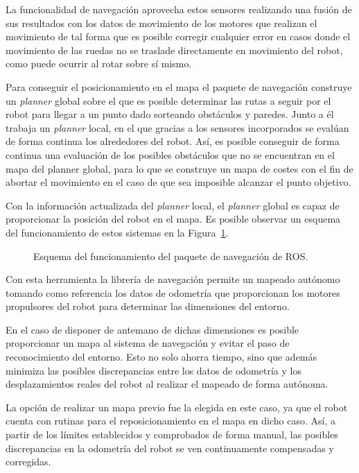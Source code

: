 La funcionalidad de navegación aprovecha estos sensores realizando una fusión de sus resultados con los datos de movimiento de los motores que realizan el movimiento de tal forma que es posible corregir cualquier error en casos donde el movimiento de las ruedas no se traslade directamente en movimiento del robot, como puede ocurrir al rotar sobre sí mismo.

Para conseguir el posicionamiento en el mapa el paquete de navegación construye un \textit{planner} global sobre el que es posible determinar las rutas a seguir por el robot para llegar a un punto dado sorteando obstáculos y paredes.
Junto a él trabaja un \textit{planner} local, en el que gracias a los sensores incorporados se evalúan de forma continua los alrededores del robot.
Así, es posible conseguir de forma continua una evaluación de los posibles obstáculos que no se encuentran en el mapa del planner global, para lo que se construye un mapa de costes con el fin de abortar el movimiento en el caso de que sea imposible alcanzar el punto objetivo.

Con la información actualizada del \textit{planner} local, el \textit{planner} global es capaz de proporcionar la posición del robot en el mapa.
Es posible observar un esquema del funcionamiento de estos sistemas en la Figura~\ref{fig:move_base}.

\begin{figure}[H]
    \centering
    \def\svgwidth{0.8\linewidth}
    
	\caption{Esquema del funcionamiento del paquete de navegación de ROS.}
    \label{fig:move_base}
\end{figure}

Con esta herramienta la librería de navegación permite un mapeado autónomo tomando como referencia los datos de odometría que proporcionan los motores propulsores del robot para determinar las dimensiones del entorno.

En el caso de disponer de antemano de dichas dimensiones es posible proporcionar un mapa al sistema de navegación y evitar el paso de reconocimiento del entorno.
Esto no solo ahorra tiempo, sino que además minimiza las posibles discrepancias entre los datos de odometría y los desplazamientos reales del robot al realizar el mapeado de forma autónoma.

La opción de realizar un mapa previo fue la elegida en este caso, ya que el robot cuenta con rutinas para el reposicionamiento en el mapa en dicho caso.
Así, a partir de los límites establecidos y comprobados de forma manual, las posibles discrepancias en la odometría del robot se ven continuamente compensadas y corregidas.

